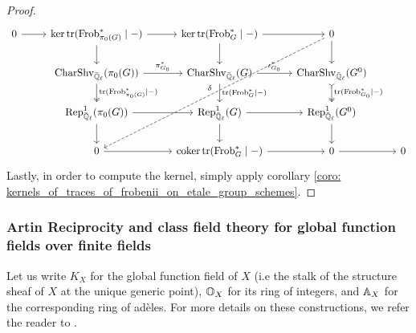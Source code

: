 \begin{proof}
                        $$
                            \begin{tikzcd}
                            	0 & {\ker \trace(\Frob^*_{\pi_0(G)} \mid -)} & {\ker \trace(\Frob^*_G \mid -)} & 0 \\
                            	& {\Char\Shv_{\bar{\Q}_{\ell}}(\pi_0(G))} & {\Char\Shv_{\bar{\Q}_{\ell}}(G)} & {\Char\Shv_{\bar{\Q}_{\ell}}(G^0)} \\
                            	& {\Rep^1_{\bar{\Q}_{\ell}}(\pi_0(G))} & {\Rep^1_{\bar{\Q}_{\ell}}(G)} & {\Rep^1_{\bar{\Q}_{\ell}}(G^0)} \\
                            	& 0 & {\coker \trace(\Frob^*_G \mid -)} & 0 & 0
                            	\arrow["{\trace(\Frob^*_{\pi_0(G)} \mid -)}", two heads, from=2-2, to=3-2]
                            	\arrow["{\trace(\Frob^*_G \mid -)}", from=2-3, to=3-3]
                            	\arrow["{\trace(\Frob^*_{G_0} \mid -)}", tail, two heads, from=2-4, to=3-4]
                            	\arrow["{\pi_{G_0}^*}", from=2-2, to=2-3]
                            	\arrow["{\iota_{G_0}^*}", from=2-3, to=2-4]
                            	\arrow[from=3-2, to=3-3]
                            	\arrow[from=3-3, to=3-4]
                            	\arrow[from=1-1, to=1-2]
                            	\arrow[from=1-2, to=1-3]
                            	\arrow[from=1-3, to=1-4]
                            	\arrow["\delta"', dashed, from=1-4, to=4-2]
                            	\arrow[from=4-2, to=4-3]
                            	\arrow[from=4-3, to=4-4]
                            	\arrow[from=4-4, to=4-5]
                            	\arrow[from=1-4, to=2-4]
                            	\arrow[from=3-4, to=4-4]
                            	\arrow[from=3-2, to=4-2]
                            	\arrow[from=1-2, to=2-2]
                            	\arrow[from=1-3, to=2-3]
                            	\arrow[from=3-3, to=4-3]
                            \end{tikzcd}
                        $$
                    Lastly, in order to compute the kernel, simply apply corollary \ref{coro: kernels_of_traces_of_frobenii_on_etale_group_schemes}.
                \end{proof}
        
        \subsubsection{Artin Reciprocity and class field theory for global function fields over finite fields}
            \begin{convention} \label{conv: global_function_field}
                Let us write $K_X$ for the global function field of $X$ (i.e the stalk of the structure sheaf of $X$ at the unique generic point), $\mathbb{O}_X$ for its ring of integers, and $\mathbb{A}_X$ for the corresponding ring of ad\`eles. For more details on these constructions, we refer the reader to \cite[Section VI.1]{neukirch_2010_algebraic_number_theory}. 
            \end{convention}
            
